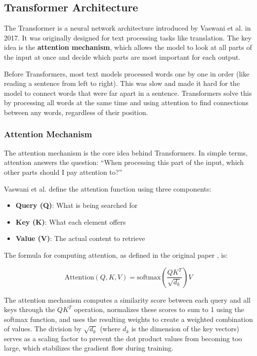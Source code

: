 \documentclass[
    english,
]{VUMIFPSbakalaurinis}
\begin{document}
\subsection{Transformer Architecture}

The Transformer is a neural network architecture introduced by Vaswani et al. \cite{Vas17} in 2017. It was originally designed for text processing tasks like translation. The key idea is the \textbf{attention mechanism}, which allows the model to look at all parts of the input at once and decide which parts are most important for each output.

Before Transformers, most text models processed words one by one in order (like reading a sentence from left to right). This was slow and made it hard for the model to connect words that were far apart in a sentence. Transformers solve this by processing all words at the same time and using attention to find connections between any words, regardless of their position.

\subsubsection{Attention Mechanism}

The attention mechanism is the core idea behind Transformers. In simple terms, attention answers the question: \enquote{When processing this part of the input, which other parts should I pay attention to?}

Vaswani et al. \cite{Vas17} define the attention function using three components:
\begin{itemize}
    \item \textbf{Query (Q)}: What is being searched for
    \item \textbf{Key (K)}: What each element offers
    \item \textbf{Value (V)}: The actual content to retrieve
\end{itemize}

The formula for computing attention, as defined in the original paper \cite{Vas17}, is:

\begin{equation}
\text{Attention}(Q, K, V) = \text{softmax}\left(\frac{QK^T}{\sqrt{d_k}}\right)V
\label{eq:attention}
\end{equation}

The attention mechanism computes a similarity score between each query and all keys through the $QK^T$ operation, normalizes these scores to sum to 1 using the softmax function, and uses the resulting weights to create a weighted combination of values. The division by $\sqrt{d_k}$ (where $d_k$ is the dimension of the key vectors) serves as a scaling factor to prevent the dot product values from becoming too large, which stabilizes the gradient flow during training.
\end{document}
